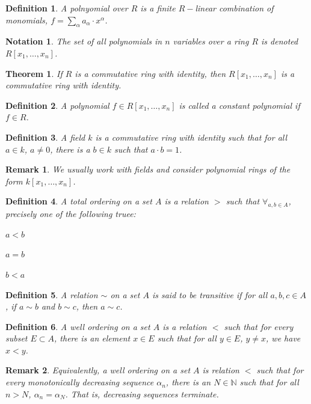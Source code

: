 \documentclass[oneside]{book}
\theoremstyle{mystyle}
\newtheorem{theorem}{Theorem}[section]
\newtheorem{definition}{Definition}[section]
\newtheorem{remark}{Remark}[section]
\newtheorem{notation}{Notation}[section]
\begin{document}
\begin{definition}
A polnyomial over $R$ is a finite $R-$linear combination of monomials, $f=\sum_{\alpha} a_{\alpha} \cdot x^{\alpha}$.
\end{definition}
\begin{notation}
The set of all polynomials in $n$ variables over a ring $R$ is denoted $R[x_1,\hdots, x_n]$.
\end{notation}
\begin{theorem}
If $R$ is a commutative ring with identity, then $R[x_1,\hdots, x_n]$ is a commutative ring with identity.
\end{theorem}
\begin{definition}
A polynomial $f\in R[x_1,\hdots, x_n]$ is called a constant polynomial if $f\in R$.
\end{definition}
\begin{definition}
A field $k$ is a commutative ring with identity such that for all $a\in k$, $a\ne 0$, there is a $b\in k$ such that $a\cdot b = 1$.
\end{definition}
\begin{remark}
We usually work with fields and consider polynomial rings of the form $k[x_1,\hdots ,x_n]$.
\end{remark}
\begin{definition}
A total ordering on a set $A$ is a relation $>$ such that $\forall_{a,b\in A}$, precisely one of the following truee:
\begin{enumerate}
    \begin{multicols}{3}
    \item $a < b$
    \item $a=b$
    \item $b<a$
    \end{multicols}
\end{enumerate}
\end{definition}
\begin{definition}
A relation $\sim$ on a set $A$ is said to be transitive if for all $a,b,c\in A$, if $a\sim b$ and $b\sim c$, then $a\sim c$.
\end{definition}
\begin{definition}
A well ordering on a set $A$ is a relation $<$ such that for every subset $E\subset A$, there is an element $x\in E$ such that for all $y\in E$, $y\ne x$, we have $x<y$.
\end{definition}
\begin{remark}
Equivalently, a well ordering on a set $A$ is relation $<$ such that for every monotonically decreasing sequence $\alpha_n$, there is an $N\in \mathbb{N}$ such that for all $n>N$, $\alpha_n = \alpha_N$. That is, decreasing sequences terminate.
\end{remark}
\end{document}
